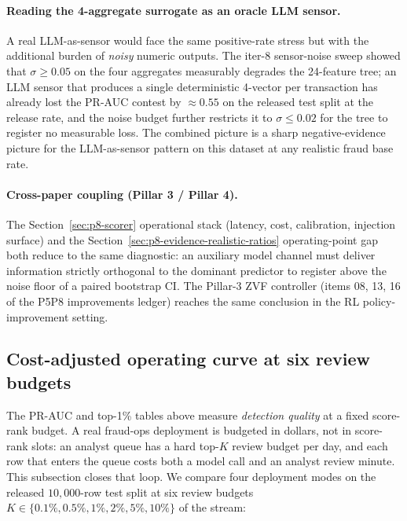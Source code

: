 \documentclass{article}
\providecommand{\secref}[1]{Section~\ref{#1}}
\begin{document}
\paragraph{Reading the 4-aggregate surrogate as an oracle LLM sensor.}
A real LLM-as-sensor would face the same positive-rate stress but with
the additional burden of \emph{noisy} numeric outputs. The iter-8
sensor-noise sweep showed that $\sigma \ge 0.05$ on the four
aggregates measurably degrades the 24-feature tree; an LLM sensor that
produces a single deterministic 4-vector per transaction has already
lost the PR-AUC contest by $\approx 0.55$ on the released test split at
the release rate, and the noise budget further restricts it to
$\sigma \le 0.02$ for the tree to register no measurable loss. The
combined picture is a sharp negative-evidence picture for the
LLM-as-sensor pattern on this dataset at any realistic fraud base
rate.

\paragraph{Cross-paper coupling (Pillar 3 / Pillar 4).} The
\secref{sec:p8-scorer} operational stack (latency, cost, calibration,
injection surface) and the \secref{sec:p8-evidence-realistic-ratios}
operating-point gap both reduce to the same diagnostic: an auxiliary
model channel must deliver information strictly orthogonal to the
dominant predictor to register above the noise floor of a paired
bootstrap CI. The Pillar-3 ZVF controller (items 08, 13, 16 of the
P5P8 improvements ledger) reaches the same conclusion in the
RL policy-improvement setting.

\subsection{Cost-adjusted operating curve at six review budgets}
\label{sec:p8-evidence-cost-curve}

The PR-AUC and top-1\% tables above measure \emph{detection quality}
at a fixed score-rank budget. A real fraud-ops deployment is budgeted
in dollars, not in score-rank slots: an analyst queue has a hard
top-$K$ review budget per day, and each row that enters the queue
costs both a model call and an analyst review minute. This subsection
closes that loop. We compare four deployment modes on the released
$10{,}000$-row test split at six review budgets $K \in \{0.1\%, 0.5\%,
1\%, 2\%, 5\%, 10\%\}$ of the stream:
\end{document}
